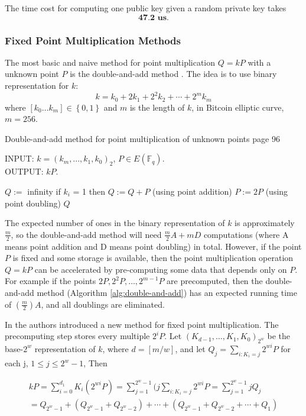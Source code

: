 The time cost for computing one public key given a random private key takes 
$$\textbf{47.2 us}. $$
\subsubsection{Fixed Point Multiplication Methods}
The most basic and naive method for point multiplication $Q=kP$ with a unknown point $P$ is the double-and-add method \cite{hankerson2006guide}.  The idea is to use binary representation for $k$:
$$ k = k_0 + 2k_1 + 2^2k_2+\cdots+2^mk_m$$
where $[k_0\dots k_m]\in \left\lbrace 0,1 \right\rbrace  $ and $m$ is the length of $k$, in Bitcoin elliptic curve, $m = 256$. 

 \begin{algorithm}[H] 
 	\caption{Double-and-add method for point multiplication of unknown points \cite{hankerson2006guide} page 96}
 	\label{alg:double-and-add}
 	INPUT: $k = (k_{m},...,k_1,k_0)_2$, $P \in E(\mathbb{F}_q)$. \\
 	OUTPUT: $kP$.
 	\begin{algorithmic} [1]
 		\STATE $Q := $ infinity
 		\STATE if $k_i$ = 1 then $Q := Q+P$  (using point addition)
 		\STATE $P:= 2P$ (using point doubling)
 		\ENDFOR
 		\RETURN $Q$
 	\end{algorithmic}
 \end{algorithm}

The expected number of ones in the binary representation of $k$ is approximately $\frac{m}{2}$, so the double-and-add method will need $\frac{m}{2}A + mD$ computations (where A means point addition and D means point doubling) in total. However, if the point $P$ is fixed and some storage is available, then the point multiplication operation $Q=kP$ can be accelerated by pre-computing some data that depends only on $P$. For example if the points $2P, 2^2P, \dots, 2^{m-1}P$ are precomputed, then the double-and-add method (Algorithm \ref{alg:double-and-add}) has an expected running time of $(\frac{m}{2})A$, and all doublings are eliminated.

In \cite{brickell1993fast} the authors introduced a new method for fixed point multiplication. The precomputing step stores every multiple $2^iP$. Let $(K_{d-1},\dots,K_1,K_0)_{2^w}$ be the base-$2^w$ representation of $k$, where $d = [m/w]$, and let $Q_j = \sum_{i:K_i=j}2^{wi}P$ for each j, $1 \leq j \leq 2^w-1$, Then 
\begin{small}
\begin{multline} 
kP = \sum_{i=0}^{d_1}K_i(2^{wi}P) = \sum_{j=1}^{2^w-1}(j\sum_{i:K_i=j}2^{wi}P = \sum_{j=1}^{2^w-1}jQ_j\\
= Q_{2^w-1}+(Q_{2^w-1}+Q_{2^w-2})+\cdots+(Q_{2^w-1}+Q_{2^w-2}+\cdots+Q_1)
\end{multline}
\end{small}

